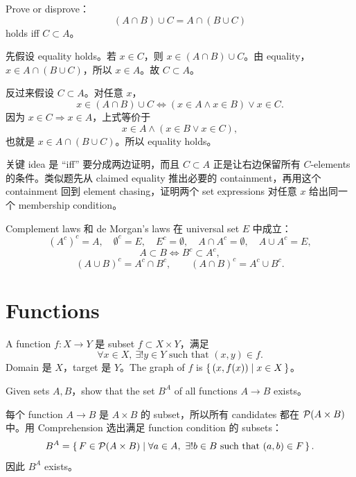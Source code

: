 \begin{exerciseblock}
Prove or disprove：
\[
(A\cap B)\cup C=A\cap(B\cup C)
\]
holds iff \(C\subset A\)。
\end{exerciseblock}

\begin{solution}
先假设 equality holds。若 \(x\in C\)，则 \(x\in(A\cap B)\cup C\)。由 equality，\(x\in A\cap(B\cup C)\)，所以 \(x\in A\)。故 \(C\subset A\)。

反过来假设 \(C\subset A\)。对任意 \(x\)，
\[
x\in(A\cap B)\cup C
\Longleftrightarrow (x\in A\land x\in B)\lor x\in C.
\]
因为 \(x\in C\Rightarrow x\in A\)，上式等价于
\[
x\in A\land(x\in B\lor x\in C),
\]
也就是 \(x\in A\cap(B\cup C)\)。所以 equality holds。
\end{solution}

\begin{explanation}
关键 idea 是 ``iff'' 要分成两边证明，而且 \(C\subset A\) 正是让右边保留所有 \(C\)-elements 的条件。类似题先从 claimed equality 推出必要的 containment，再用这个 containment 回到 element chasing，证明两个 set expressions 对任意 \(x\) 给出同一个 membership condition。
\end{explanation}

Complement laws 和 de Morgan's laws 在 universal set \(E\) 中成立：
\[
(A^c)^c=A,\quad \emptyset^c=E,\quad E^c=\emptyset,\quad
A\cap A^c=\emptyset,\quad A\cup A^c=E,
\]
\[
A\subset B\Longleftrightarrow B^c\subset A^c,
\]
\[
(A\cup B)^c=A^c\cap B^c,\qquad (A\cap B)^c=A^c\cup B^c.
\]

\section{Functions}

A function \(f:X\to Y\) 是 subset \(f\subset X\times Y\)，满足
\[
\forall x\in X,\ \exists!y\in Y\text{ such that }(x,y)\in f.
\]
Domain 是 \(X\)，target 是 \(Y\)。The graph of \(f\) is \(\left\{\,(x,f(x))\mid x\in X\,\right\}\)。

\begin{exerciseblock}
Given sets \(A,B\)，show that the set \(B^A\) of all functions \(A\to B\) exists。
\end{exerciseblock}

\begin{solution}
每个 function \(A\to B\) 是 \(A\times B\) 的 subset，所以所有 candidates 都在 \(\mathcal{P}(A\times B)\) 中。用 Comprehension 选出满足 function condition 的 subsets：
\[
B^A=\left\{\,F\in\mathcal{P}(A\times B)\mid \forall a\in A,\ \exists!b\in B\text{ such that }(a,b)\in F\,\right\}.
\]
因此 \(B^A\) exists。
\end{solution}

